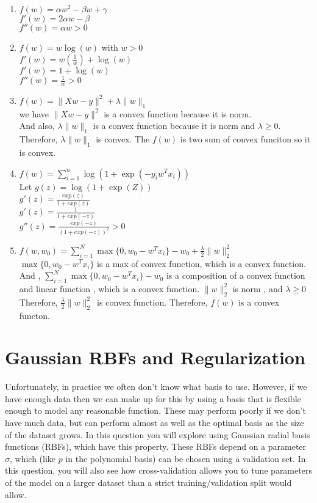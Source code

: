 \documentclass{article}
\def\norm#1{\|#1\|}
\def\enum#1{\begin{enumerate}#1\end{enumerate}}
\begin{document}
\enum{
\item $f(w) = \alpha w^2 - \beta w + \gamma$\\
         $f'(w) = 2\alpha w  - \beta $\\
          $f''(w) = \alpha w   >0  $
\item $f(w) = w\log(w) $ with $w > 0$\\ 
       $f'(w) = w(\frac{1}{w})+ \log(w) $\\
       $f'(w) = 1+ \log(w) $ \\
       $f''(w) = \frac{1}{w}  >0 $
\item $f(w) = \norm{Xw-y}^2 + \lambda\norm{w}_1$ \\
        we have $ \norm{Xw-y}^2$ is a convex function because it is norm.\\
       And also, $\lambda\norm{w}_1$  is a convex function because it is norm and $\lambda \geq 0$.\\ Therefore, $\lambda\norm{w}_1$ is convex. The $f(w)$ is two sum of convex funciton so it is convex. 
\item $f(w) = \sum_{i=1}^n \log(1+\exp(-y_iw^Tx_i))$\\
      Let  $g(z) = \log(1+\exp(Z))$\\
        $g'(z) = \frac{exp(z)}{1+exp(z)}$\\
         $g'(z) = \frac{1}{1+exp(-z)}$\\
        $g''(z) =  \frac{exp(-z)}{(1+exp(-z))^2}   > 0 $
\item $f(w,w_0) = \sum_{i=1}^N\max\{0,w_0 - w^Tx_i\} - w_0 + \frac{\lambda}{2}\norm{w}_2^2$\\
        $\max\{0,w_0 - w^Tx_i\} $ is a max of convex function, which  is a convex function.\\ And , $\sum_{i=1}^N\max\{0,w_0 - w^Tx_i\} - w_0  $ is a composition of a convex function and linear function , which is a convex function. $\norm{w}_2^2$ is norm , and $\lambda \geq 0$ Therefore, $ \frac{\lambda}{2}\norm{w}_2^2$\ is convex function.
Therefore, $f(w)$ is a convex functon.
}


\section{Gaussian RBFs and Regularization}

Unfortunately, in practice we often don't know what basis to use. However, if we have enough data then we can make up for this by using a basis that is flexible enough to model any reasonable function. These may perform poorly if we don't have much data, but can perform almost as well as the optimal basis as the size of the dataset grows. In this question you will explore using Gaussian radial basis functions (RBFs), which have this property. These RBFs depend on a parameter $\sigma$, which (like $p$ in the polynomial basis) can be chosen using a validation set. In this question, you will also see how cross-validation allows you to tune parameters of the model on a larger dataset than a strict training/validation split would allow.
\end{document}
